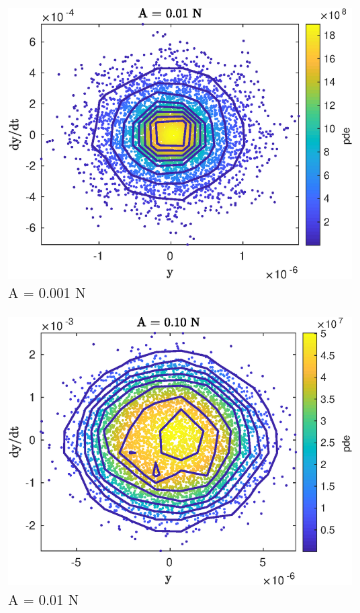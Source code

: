 \documentclass[aspectratio=169]{beamer}
\begin{document}
\begin{frame}[allowframebreaks]
\begin{figure}[!h]
    \begin{subfigure}{0.2\linewidth}
      \includegraphics[width=\linewidth]{../../benchmark4/extabs_fig/b4_tdata_kern_famp001}
      \caption{A = 0.001 N}
    \end{subfigure}%
    \begin{subfigure}{0.2\linewidth}
      \includegraphics[width=\linewidth]{../../benchmark4/extabs_fig/b4_tdata_kern_famp01}
      \caption{A = 0.01 N}
    \end{subfigure}%
    \begin{subfigure}{0.2\linewidth}

\end{subfigure}
\end{figure}
\end{frame}
\end{document}
